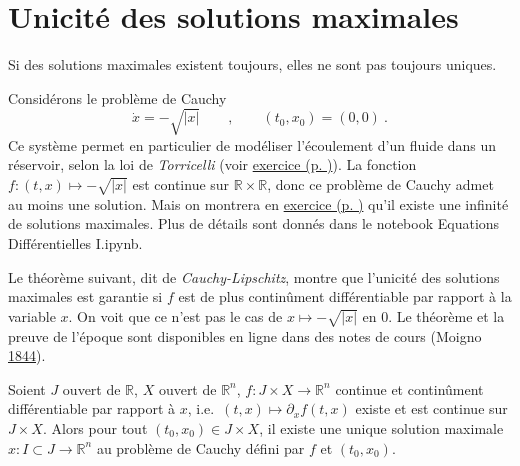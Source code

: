 \hypertarget{unicituxe9-des-solutions-maximales}{%
\section{Unicité des solutions
maximales}\label{unicituxe9-des-solutions-maximales}}

Si des solutions maximales existent toujours, elles ne sont pas toujours
uniques.

\hypertarget{ex_nonUnique}{}
\begin{exemple}\label{ex_nonUnique}
Considérons le problème de Cauchy \[
\dot{x}=-\sqrt{|x|} \qquad , \qquad (t_0,x_0)=(0,0) \ .
\] Ce système permet en particulier de modéliser l'écoulement d'un
fluide dans un réservoir, selon la loi de \emph{Torricelli} (voir
\protect\hyperlink{exo_Torricelli}{exercice (p.
\pageref*{exo_Torricelli})}). La fonction \(f:(t,x)\mapsto -\sqrt{|x|}\)
est continue sur \(\mathbb{R}\times \mathbb{R}\), donc ce problème de
Cauchy admet au moins une solution. Mais on montrera en
\protect\hyperlink{exo_Torricelli}{exercice (p.
\pageref*{exo_Torricelli})} qu'il existe une infinité de solutions
maximales. Plus de détails sont donnés dans le notebook Equations
Différentielles I.ipynb.

Le théorème suivant, dit de \emph{Cauchy-Lipschitz}, montre que
l'unicité des solutions maximales est garantie si \(f\) est de plus
continûment différentiable par rapport à la variable \(x\). On voit que
ce n'est pas le cas de \(x\mapsto -\sqrt{|x|}\) en 0. Le théorème et la
preuve de l'époque sont disponibles en ligne dans des notes de cours
(Moigno \protect\hyperlink{ref-cauchy}{1844}).
\end{exemple}

\hypertarget{theo_lips}{}
\begin{theoreme}\label{theo_lips}
Soient \(J\) ouvert de \(\mathbb{R}\), \(X\) ouvert de
\(\mathbb{R}^{n}\), \(f: J\times X \to \mathbb{R}^n\) continue et
continûment différentiable par rapport à \(x\),
i.e.~\((t,x)\mapsto \partial_x f(t,x)\) existe et est continue sur
\(J\times X\). Alors pour tout \((t_0,x_0)\in J\times X\), il existe une
unique solution maximale \(x:I\subset J\to\mathbb{R}^n\) au problème de
Cauchy défini par \(f\) et \((t_0,x_0)\).
\end{theoreme}


